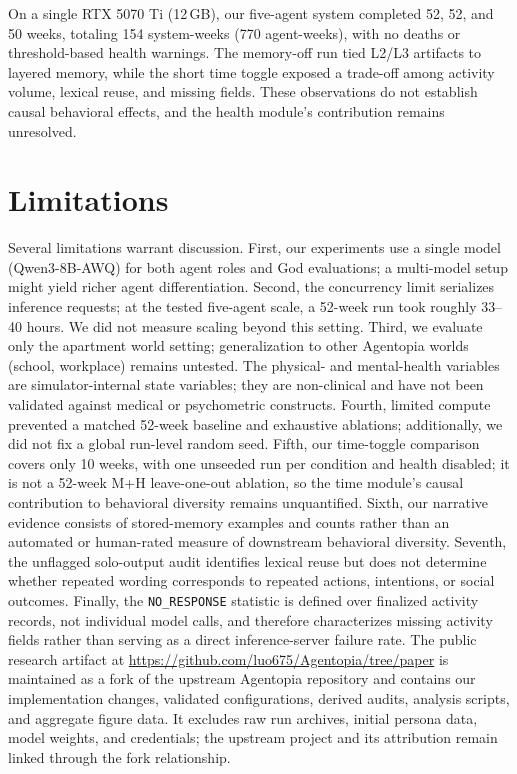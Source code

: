 \documentclass[11pt]{article}
\begin{document}
On a single RTX 5070 Ti (12\,GB), our five-agent system completed 52, 52, and 50 weeks, totaling 154 system-weeks (770 agent-weeks), with no deaths or threshold-based health warnings.
The memory-off run tied L2/L3 artifacts to layered memory, while the short time toggle exposed a trade-off among activity volume, lexical reuse, and missing fields.
These observations do not establish causal behavioral effects, and the health module's contribution remains unresolved.

\section*{Limitations}

Several limitations warrant discussion.
First, our experiments use a single model (Qwen3-8B-AWQ) for both agent roles and God evaluations; a multi-model setup might yield richer agent differentiation.
Second, the concurrency limit serializes inference requests; at the tested five-agent scale, a 52-week run took roughly 33--40 hours. We did not measure scaling beyond this setting.
Third, we evaluate only the apartment world setting; generalization to other Agentopia worlds (school, workplace) remains untested.
The physical- and mental-health variables are simulator-internal state variables; they are non-clinical and have not been validated against medical or psychometric constructs.
Fourth, limited compute prevented a matched 52-week baseline and exhaustive ablations; additionally, we did not fix a global run-level random seed.
Fifth, our time-toggle comparison covers only 10 weeks, with one unseeded run per condition and health disabled; it is not a 52-week M+H leave-one-out ablation, so the time module's causal contribution to behavioral diversity remains unquantified.
Sixth, our narrative evidence consists of stored-memory examples and counts rather than an automated or human-rated measure of downstream behavioral diversity.
Seventh, the unflagged solo-output audit identifies lexical reuse but does not determine whether repeated wording corresponds to repeated actions, intentions, or social outcomes.
Finally, the \texttt{NO\_RESPONSE} statistic is defined over finalized activity records, not individual model calls, and therefore characterizes missing activity fields rather than serving as a direct inference-server failure rate.
The public research artifact at \url{https://github.com/luo675/Agentopia/tree/paper} is maintained as a fork of the upstream Agentopia repository and contains our implementation changes, validated configurations, derived audits, analysis scripts, and aggregate figure data.
It excludes raw run archives, initial persona data, model weights, and credentials; the upstream project and its attribution remain linked through the fork relationship.



\end{document}
